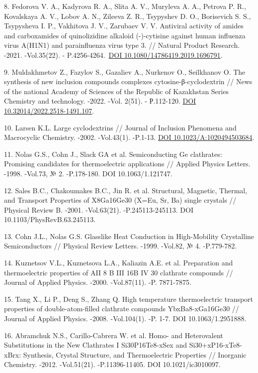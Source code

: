 8. Fedorova V. A., Kadyrova R. A., Slita A. V., Muryleva A. A., Petrova
P. R., Kovalskaya A. V., Lobov A. N., Zileeva Z. R., Tsypyshev D. O.,
Borisevich S. S., Tsypysheva I. P., Vakhitova J. V., Zarubaev V. V.
Antiviral activity of amides and carboxamides of quinolizidine alkaloid
(-)-cytisine against human influenza virus A(H1N1) and parainfluenza
virus type 3. // Natural Product Research. -2021. -Vol.35(22). -
P.4256-4264.~\href{https://doi.org/10.1080/14786419.2019.1696791}{DOI
10.1080/14786419.2019.1696791}.

9. Muldakhmetov Z., Fazylov S., Gazaliev A., Nurkenov O., Seilkhanov O.
The synthesis of new inclusion compounds complexes
cytosine-β-cyclodextrin // News of the national Academy of Sciences of
the Republic of Kazakhstan Series Chemistry and technology. -2022. -Vol.
2(51). - Р.112-120.
\href{https://doi.org/10.32014/2022.2518-1491.107}{DOI
10.32014/2022.2518-1491.107}.

10. Larsen K.L. Large cyclodextrins // Journal of Inclusion Phenomena
and Macrocyclic Chemistry. -2002. -Vol.43(1). -P.1-13.
\href{https://doi.org/10.1023/A:1020494503684}{DOI
10.1023/A:1020494503684}.

11. Nolas G.S., Cohn J., Slack GA et al. Semiconducting Ge clathrates:
Promising candidates for thermoelectric applications // Applied Physics
Letters. -1998. -Vol.73, № 2. -P.178-180. DOI 10.1063/1.121747.

12. Sales B.C., Chakoumakes B.C., Jin R. et al. Structural, Magnetic,
Thermal, and Transport Properties of X8Ga16Ge30 (X=Eu, Sr, Ba) single
crystals // Physical Review B. -2001. -Vol.63(21). -P.245113-245113.
DOI 10.1103/PhysRevB.63.245113.

13. Cohn J.L., Nolas G.S. Glasslike Heat Conduction in High-Mobility
Crystalline Semiconductors // Physical Review Letters. -1999. -Vol.82,
№ 4. -P.779-782.

14. Kuznetsov V.L., Kuznetsova L.A., Kaliazin A.E. et al. Preparation
and thermoelectric properties of AII 8 B III 16B IV 30 clathrate
compounds // Journal of Applied Physics. -2000. -Vol.87(11). -P.
7871-7875.

15. Tang X., Li P., Deng S., Zhang Q. High temperature thermoelectric
transport properties of double-atom-filled clathrate compounds
YbxBa8-xGa16Ge30 // Journal of Applied Physics. -2008. -Vol.104(1). -P.
1-7. DOI 10.1063/1.2951888.

16. Abramchuk N.S., Carillo-Cabrera W. et al. Homo- and Heterovalent
Substitutions in the New Clathrates I Si30P16Te8-xSex and
Si30+xP16-xTe8-xBrx: Synthesis, Crystal Structure, and Thermoelectric
Properties // Inorganic Chemistry. -2012. -Vol.51(21). -P.11396-11405.
DOI 10.1021/ic3010097.

